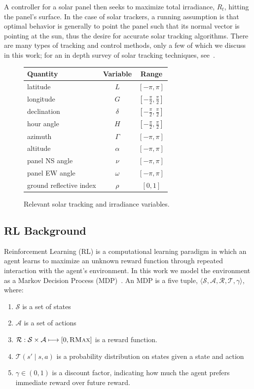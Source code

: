 \documentclass{article}
\newcommand{\mc}{\mathcal}
\begin{document}
A controller for a solar panel then seeks to maximize total irradiance, $R_t$, hitting the panel's surface. In the case of solar trackers, a running assumption is that optimal behavior is generally to point the panel such that its normal vector is pointing at the sun, thus the desire for accurate solar tracking algorithms. There are many types of tracking and control methods, only a few of which we discuss in this work; for an in depth survey of solar tracking techniques, see~\citet{mousazadeh2009review}.

{\renewcommand{\arraystretch}{1.2}%
\begin{figure}
\centering
\begin{tabular}{lcc}
\toprule
Quantity& Variable& Range \\
\midrule
latitude& $L$& $[-\pi, \pi]$ \\
longitude& $G$&  $\left[-\frac{\pi}{2}, \frac{\pi}{2}\right]$\\
declination& $\delta$ & $\left[-\frac{\pi}{2}, \frac{\pi}{2}\right]$ \\
hour angle& $H$& $\left[-\frac{\pi}{2}, \frac{\pi}{2}\right]$ \\
azimuth& $\Gamma$& $[-\pi, \pi]$ \\
altitude& $\alpha$& $[-\pi, \pi]$ \\
panel NS angle& $\nu$& $[-\pi, \pi]$ \\
panel EW angle& $\omega$& $[-\pi, \pi]$ \\
ground reflective index& $\rho$& $[0,1]$ \\
\bottomrule
\end{tabular}
\caption{Relevant solar tracking and irradiance variables.}
\end{figure}

\subsection{RL Background}

Reinforcement Learning (RL) is a computational learning paradigm in which an agent learns to maximize an unknown reward function through repeated interaction with the agent's environment. In this work we model the environment as a Markov Decision Process (MDP)~\cite{puterman2014markov}. An MDP is a five tuple, $\langle \mc{S}, \mc{A}, \mc{R}, \mc{T}, \gamma \rangle$, where:
\begin{enumerate}
\item $\mc{S}$ is a set of states
\item $\mc{A}$ is a set of actions
\item $\mc{R} : \mc{S} \times \mc{A} \longmapsto [0,\textsc{RMax}] $ is a reward function.
\item $\mc{T}(s' \mid s,a)$ is a probability distribution on states given a state and action
\item $\gamma \in (0,1)$ is a discount factor, indicating how much the agent prefers immediate reward over future reward.
\end{enumerate}

}
\end{document}
